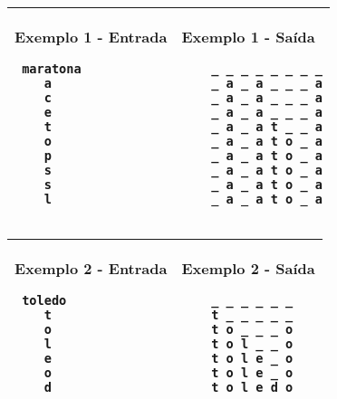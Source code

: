         \begin{table}[!h]
\centering
\begin{tabular}{|l|l|}
\hline
\begin{minipage}[t]{3in}
\textbf{Exemplo 1 - Entrada}
\begin{verbatim}
 maratona
    a
    c
    e
    t
    o
    p
    s
    s
    l
\end{verbatim}
\vspace{1mm}
\end{minipage}
&
\begin{minipage}[t]{3in}
\textbf{Exemplo 1 - Saída}
\begin{verbatim}
    _ _ _ _ _ _ _ _
    _ a _ a _ _ _ a
    _ a _ a _ _ _ a
    _ a _ a _ _ _ a
    _ a _ a t _ _ a
    _ a _ a t o _ a
    _ a _ a t o _ a
    _ a _ a t o _ a
    _ a _ a t o _ a
    _ a _ a t o _ a
\end{verbatim}
\vspace{1mm}
\end{minipage} \\
\hline
\end{tabular}
\end{table}


    \begin{table}[!h]
\centering
\begin{tabular}{|l|l|}
\hline
\begin{minipage}[t]{3in}
\textbf{Exemplo 2 - Entrada}
\begin{verbatim}
 toledo
    t
    o
    l
    e
    o
    d
\end{verbatim}
\vspace{1mm}
\end{minipage}
&
\begin{minipage}[t]{3in}
\textbf{Exemplo 2 - Saída}
\begin{verbatim}
    _ _ _ _ _ _ 
    t _ _ _ _ _ 
    t o _ _ _ o
    t o l _ _ o
    t o l e _ o
    t o l e _ o
    t o l e d o
\end{verbatim}
\vspace{1mm}
\end{minipage} \\
\hline
\end{tabular}
\end{table}
